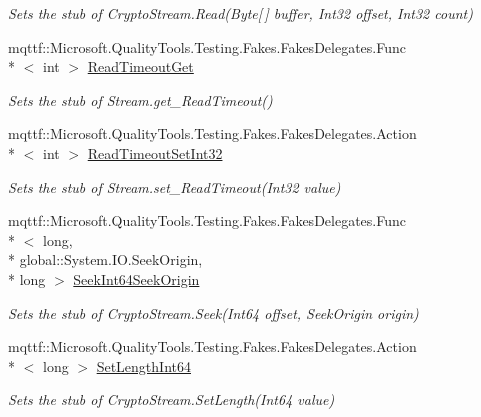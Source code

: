 \begin{DoxyCompactItemize}
\begin{DoxyCompactList}\small\item\em Sets the stub of Crypto\-Stream.\-Read(\-Byte\mbox{[}$\,$\mbox{]} buffer, Int32 offset, Int32 count)\end{DoxyCompactList}\item 
mqttf\-::\-Microsoft.\-Quality\-Tools.\-Testing.\-Fakes.\-Fakes\-Delegates.\-Func\\*
$<$ int $>$ \hyperlink{class_system_1_1_security_1_1_cryptography_1_1_fakes_1_1_stub_crypto_stream_adb76fb58f0efe7472e1ea0c6a961616c}{Read\-Timeout\-Get}
\begin{DoxyCompactList}\small\item\em Sets the stub of Stream.\-get\-\_\-\-Read\-Timeout()\end{DoxyCompactList}\item 
mqttf\-::\-Microsoft.\-Quality\-Tools.\-Testing.\-Fakes.\-Fakes\-Delegates.\-Action\\*
$<$ int $>$ \hyperlink{class_system_1_1_security_1_1_cryptography_1_1_fakes_1_1_stub_crypto_stream_a306841253bf5606215f5a7df95b39513}{Read\-Timeout\-Set\-Int32}
\begin{DoxyCompactList}\small\item\em Sets the stub of Stream.\-set\-\_\-\-Read\-Timeout(\-Int32 value)\end{DoxyCompactList}\item 
mqttf\-::\-Microsoft.\-Quality\-Tools.\-Testing.\-Fakes.\-Fakes\-Delegates.\-Func\\*
$<$ long, \\*
global\-::\-System.\-I\-O.\-Seek\-Origin, \\*
long $>$ \hyperlink{class_system_1_1_security_1_1_cryptography_1_1_fakes_1_1_stub_crypto_stream_abbd6f55d8ce4b3f8385a58a6ee74b775}{Seek\-Int64\-Seek\-Origin}
\begin{DoxyCompactList}\small\item\em Sets the stub of Crypto\-Stream.\-Seek(\-Int64 offset, Seek\-Origin origin)\end{DoxyCompactList}\item 
mqttf\-::\-Microsoft.\-Quality\-Tools.\-Testing.\-Fakes.\-Fakes\-Delegates.\-Action\\*
$<$ long $>$ \hyperlink{class_system_1_1_security_1_1_cryptography_1_1_fakes_1_1_stub_crypto_stream_a1c21fe454e944fe43a484f795e996b3f}{Set\-Length\-Int64}
\begin{DoxyCompactList}\small\item\em Sets the stub of Crypto\-Stream.\-Set\-Length(\-Int64 value)\end{DoxyCompactList}\item 

\end{DoxyCompactItemize}
